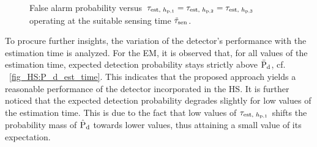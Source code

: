 \begin{figure}[!t]

\centering
{}
\caption{False alarm probability versus $\tau_{\text{est, $h_{\text{p,1}}$}} = \tau_{\text{est, $h_{\text{p,2}}$}} = \tau_{\text{est, $h_{\text{p,3}}$}}$ operating at the suitable sensing time $\tilde{\tau}_{\text{sen}}$.}
\label{fig_HS:P_f_est_time}
\end{figure}

To procure further insights, the variation of the detector's performance with the estimation time is analyzed. For the EM, it is observed that, for all values of the estimation time, expected detection probability stays strictly above $\bar{\text{P}}_{\text{d}}$, cf. \figurename~\ref{fig_HS:P_d_est_time}. This indicates that the proposed approach yields a reasonable performance of the detector incorporated in the HS. It is further noticed that the expected detection probability degrades slightly for low values of the estimation time. This is due to the fact that low values of $\tau_{\text{est, $h_{\text{p,1}}$}}$ shifts the probability mass of $\hat{\text{P}}_{\text{d}}$ towards lower values, thus attaining a small value of its expectation. 

